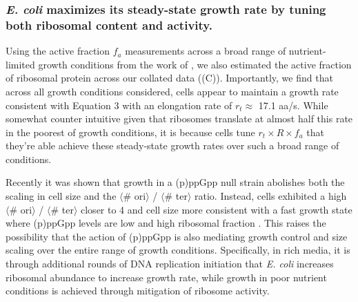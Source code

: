 \subsubsection{\textit{E. coli} maximizes its steady-state growth
rate by tuning both ribosomal content and activity.}

Using the active fraction $f_a$ measurements across a broad range of
nutrient-limited growth conditions from the work of \cite{dai2016}, we also
estimated the active fraction of ribosomal protein across our collated data
((C)). Importantly, we find that across all growth
conditions considered, cells appear to maintain a growth rate consistent with
Equation 3 with an elongation rate of $r_t \approx$  17.1 aa/s. While somewhat
counter intuitive given that ribosomes translate at almost half this rate in the
poorest of growth conditions, it is because cells tune $r_t \times R \times f_a$
that they're able achieve these steady-state growth rates over such a broad
range of conditions.

Recently it was shown that growth in a (p)ppGpp null strain abolishes both the
scaling in cell size and the $\langle$\# ori$\rangle$ / $\langle$\# ter$\rangle$
ratio. Instead, cells exhibited a high $\langle$\# ori$\rangle$ / $\langle$\#
ter$\rangle$ closer to 4 and cell size more consistent with a fast growth state
where (p)ppGpp levels are low \citep{fernandezcoll2020} and high ribosomal
fraction \citep{zhu2019}. This raises the possibility that the action of
(p)ppGpp is also mediating growth control and size scaling over the entire range
of growth conditions. Specifically, in rich media, it is through additional
rounds of DNA replication initiation that \textit{E. coli} increases ribosomal
abundance to increase growth rate, while growth in poor nutrient conditions is
achieved through mitigation of ribosome activity.
